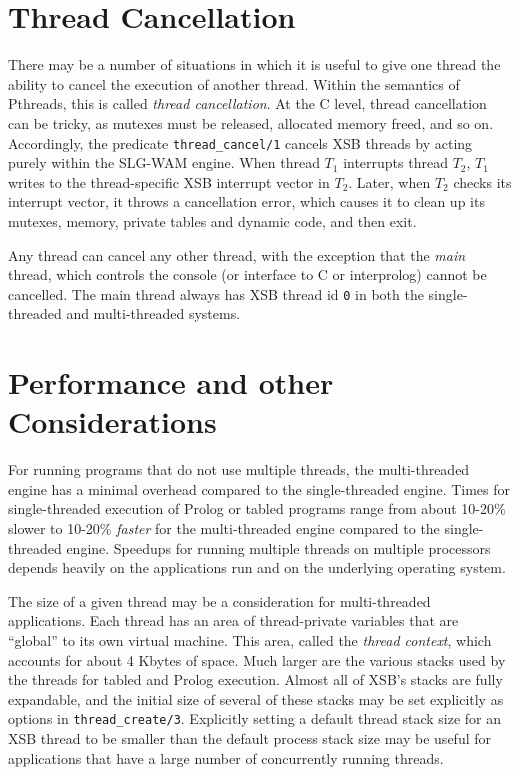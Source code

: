 \section{Thread Cancellation}
%
There may be a number of situations in which it is useful to give one
thread the ability to cancel the execution of another thread.  Within
the semantics of Pthreads, this is called {\em thread cancellation}.
At the C level, thread cancellation can be tricky, as mutexes must be
released, allocated memory freed, and so on.  Accordingly, the
predicate {\tt thread\_cancel/1} cancels XSB threads by acting purely
within the SLG-WAM engine.  When thread $T_1$ interrupts thread $T_2$,
$T_1$ writes to the thread-specific XSB interrupt vector in $T_2$.
Later, when $T_2$ checks its interrupt vector, it throws a
cancellation error, which causes it to clean up its mutexes, memory,
private tables and dynamic code, and then exit.

Any thread can cancel any other thread, with the exception that the
{\em main} thread, which controls the console (or interface to C or
interprolog) cannot be cancelled.  The main thread always has XSB
thread id {\tt 0} in both the single-threaded and multi-threaded
systems.

\section{Performance and other Considerations}
%
For running programs that do not use multiple threads, the
multi-threaded engine has a minimal overhead compared to the
single-threaded engine.  Times for single-threaded execution of Prolog
or tabled programs range from about 10-20\% slower to 10-20\% {\em
  faster} for the multi-threaded engine compared to the
single-threaded engine.  Speedups for running multiple threads on
multiple processors depends heavily on the applications run and on the
underlying operating system.

The size of a given thread may be a consideration for multi-threaded
applications.  Each thread has an area of thread-private variables
that are ``global'' to its own virtual machine.  This area, called the
{\em thread context}, which accounts for about 4 Kbytes of space.
Much larger are the various stacks used by the threads for tabled and
Prolog execution.  Almost all of XSB's stacks are fully expandable,
and the initial size of several of these stacks may be set explicitly
as options in {\tt thread\_create/3}.  Explicitly setting a default
thread stack size for an XSB thread to be smaller than the default
process stack size may be useful for applications that have a large
number of concurrently running threads.

